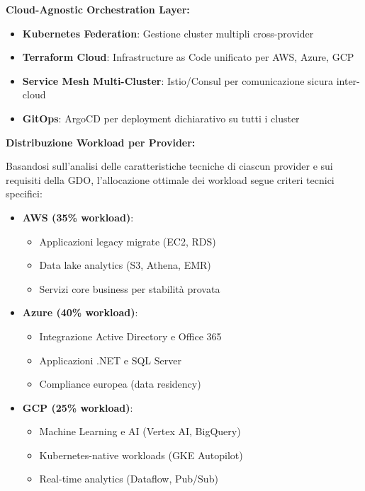 \textbf{Cloud-Agnostic Orchestration Layer:}
\begin{itemize}
    \item \textbf{Kubernetes Federation}: Gestione cluster multipli cross-provider
    \item \textbf{Terraform Cloud}: Infrastructure as Code unificato per AWS, Azure, GCP
    \item \textbf{Service Mesh Multi-Cluster}: Istio/Consul per comunicazione sicura inter-cloud
    \item \textbf{GitOps}: ArgoCD per deployment dichiarativo su tutti i cluster
\end{itemize}

\textbf{Distribuzione Workload per Provider:}

Basandosi sull'analisi delle caratteristiche tecniche di ciascun provider e sui requisiti della GDO, l'allocazione ottimale dei workload segue criteri tecnici specifici:

\begin{itemize}
    \item \textbf{AWS (35\% workload)}:
    \begin{itemize}
        \item Applicazioni legacy migrate (EC2, RDS)
        \item Data lake analytics (S3, Athena, EMR)
        \item Servizi core business per stabilità provata
    \end{itemize}
    
    \item \textbf{Azure (40\% workload)}:
    \begin{itemize}
        \item Integrazione Active Directory e Office 365
        \item Applicazioni .NET e SQL Server
        \item Compliance europea (data residency)
    \end{itemize}
    
    \item \textbf{GCP (25\% workload)}:
    \begin{itemize}
        \item Machine Learning e AI (Vertex AI, BigQuery)
        \item Kubernetes-native workloads (GKE Autopilot)
        \item Real-time analytics (Dataflow, Pub/Sub)
    \end{itemize}
\end{itemize}

